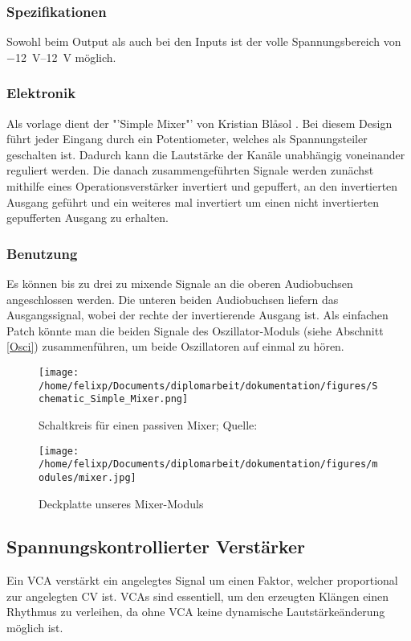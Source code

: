 \subsubsection{Spezifikationen}
\label{sec:org7c10e60}
Sowohl beim Output als auch bei den Inputs ist der volle Spannungsbereich von \SIrange{-12}{+12}{\volt} möglich.

\subsubsection{Elektronik}
\label{sec:org9dbdb0e}
Als vorlage dient der "'Simple Mixer"' von Kristian Blåsol \cite{miaw:mixer}. Bei diesem Design führt jeder Eingang durch ein Potentiometer, welches als Spannungsteiler geschalten ist. Dadurch kann die Lautstärke der Kanäle unabhängig voneinander reguliert werden. Die danach zusammengeführten Signale werden zunächst mithilfe eines Operationsverstärker invertiert und gepuffert, an den invertierten Ausgang geführt und ein weiteres mal invertiert um einen nicht invertierten gepufferten Ausgang zu erhalten.

\subsubsection{Benutzung}
\label{sec:orga6feb5b}
Es können bis zu drei zu mixende Signale an die oberen Audiobuchsen angeschlossen werden. Die unteren beiden Audiobuchsen liefern das Ausgangssignal, wobei der rechte der invertierende Ausgang ist. Als einfachen Patch könnte man die beiden Signale des Oszillator-Moduls (siehe Abschnitt \ref{Osci}) zusammenführen, um beide Oszillatoren auf einmal zu hören.

\begin{figure}[hp]
\centering
\texttt{[image: /home/felixp/Documents/diplomarbeit/dokumentation/figures/Schematic\_Simple\_Mixer.png]}
\caption{Schaltkreis für einen passiven Mixer; Quelle: \cite{miaw:mixer}}
\end{figure}

\begin{figure}[hp]
\centering
\texttt{[image: /home/felixp/Documents/diplomarbeit/dokumentation/figures/modules/mixer.jpg]}
\caption{Deckplatte unseres Mixer-Moduls}
\end{figure}
\subsection{Spannungskontrollierter Verstärker \label{VCA}}
\label{sec:orga3e20b5}
Ein \acf{VCA} verstärkt ein angelegtes Signal um einen Faktor, welcher proportional zur angelegten \acl{CV} ist. \acp{VCA} sind essentiell, um den erzeugten Klängen einen Rhythmus zu verleihen, da ohne \ac{VCA} keine dynamische Lautstärkeänderung möglich ist.

